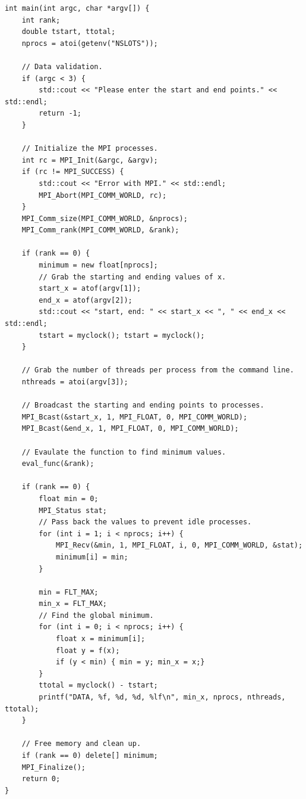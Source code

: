 \documentclass[notitlepage, letterpaper, 12pt]{report}
\begin{document}
\begin{lstlisting}
int main(int argc, char *argv[]) {
	int rank;
	double tstart, ttotal;
	nprocs = atoi(getenv("NSLOTS"));

	// Data validation.
	if (argc < 3) {
		std::cout << "Please enter the start and end points." << std::endl;
		return -1;
	}
	
	// Initialize the MPI processes.
	int rc = MPI_Init(&argc, &argv);
	if (rc != MPI_SUCCESS) {
		std::cout << "Error with MPI." << std::endl;
		MPI_Abort(MPI_COMM_WORLD, rc);
	}
	MPI_Comm_size(MPI_COMM_WORLD, &nprocs);
	MPI_Comm_rank(MPI_COMM_WORLD, &rank);
		
	if (rank == 0) {
		minimum = new float[nprocs];
		// Grab the starting and ending values of x.
		start_x = atof(argv[1]);
		end_x = atof(argv[2]);
		std::cout << "start, end: " << start_x << ", " << end_x << std::endl;
		tstart = myclock(); tstart = myclock();
	}

	// Grab the number of threads per process from the command line.
	nthreads = atoi(argv[3]);

	// Broadcast the starting and ending points to processes.
	MPI_Bcast(&start_x, 1, MPI_FLOAT, 0, MPI_COMM_WORLD);
	MPI_Bcast(&end_x, 1, MPI_FLOAT, 0, MPI_COMM_WORLD);
	
	// Evaulate the function to find minimum values.
	eval_func(&rank);

	if (rank == 0) {
		float min = 0;
		MPI_Status stat;
		// Pass back the values to prevent idle processes. 
		for (int i = 1; i < nprocs; i++) {
			MPI_Recv(&min, 1, MPI_FLOAT, i, 0, MPI_COMM_WORLD, &stat);
			minimum[i] = min; 
		}
		
		min = FLT_MAX;
		min_x = FLT_MAX;
		// Find the global minimum.
		for (int i = 0; i < nprocs; i++) {
			float x = minimum[i];
			float y = f(x); 
			if (y < min) { min = y; min_x = x;}	
		}
		ttotal = myclock() - tstart;
		printf("DATA, %f, %d, %d, %lf\n", min_x, nprocs, nthreads, ttotal);	
	}

	// Free memory and clean up.
	if (rank == 0) delete[] minimum;
	MPI_Finalize();
	return 0;
}

\end{lstlisting}
\newpage
\end{document}
